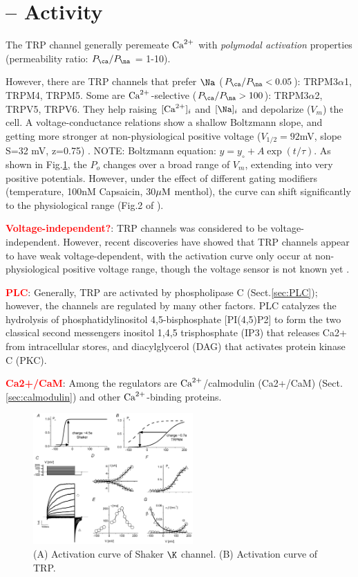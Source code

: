 \section{-- Activity}
\label{sec:TRP-regulator}

The TRP channel generally peremeate ${\text{Ca}^{2+}}$ with {\it polymodal activation}
properties (permeability ratio: $P_\ca/P_\na$ = 1-10). 

However, there are TRP channels that prefer $\Na$ ($P_\ca/P_\na< 0.05$):
TRPM3$\alpha$1, TRPM4, TRPM5.
Some are ${\text{Ca}^{2+}}$-selective ($P_\ca/P_\na>100$): TRPM3$\alpha$2, TRPV5, TRPV6.
They help raising $[{\text{Ca}^{2+}}]_i$ and $[\Na]_i$ and depolarize ($V_m$) the cell. A
voltage-conductance relations show a shallow Boltzmann slope, and getting more
stronger at non-physiological positive voltage ($V_{1/2}=92$mV, slope S=32 mV,
z=0.75) \citep{nilius2005}. NOTE: Boltzmann equation: $y=y_\circ +
A\exp(t/\tau)$. As shown in Fig.\ref{fig:TRP_Vm}, the $P_o$ changes over a broad
range of $V_m$, extending into very positive potentials. However, under the
effect of different gating modifiers (temperature, 100nM Capsaicin, 30${\mu\text{M}}$
menthol), the curve can shift significantly to the physiological range (Fig.2 of
\citep{nilius2005}).

\textcolor{red}{\bf Voltage-independent?}: TRP channels was considered to be
voltage-independent. However, recent discoveries have showed that TRP channels
appear to have weak voltage-dependent, with the activation curve only occur at
non-physiological positive voltage range, though the voltage sensor is not known
yet \citep{nilius2005}.


\textcolor{red}{\bf PLC}: Generally, TRP are activated by phospholipase C
(Sect.\ref{sec:PLC}); however, the channels are regulated by many other factors.
PLC catalyzes the hydrolysis of phosphatidylinositol 4,5-bisphosphate
[PI(4,5)P2] to form the two classical second messengers inositol 1,4,5
trisphosphate (IP3) that releases Ca2+ from intracellular stores, and
diacylglycerol (DAG) that activates protein kinase C (PKC).

\textcolor{red}{\bf Ca2+/CaM}: Among the regulators are ${\text{Ca}^{2+}}$/calmodulin
(Ca2+/CaM) (Sect.\ref{sec:calmodulin}) and other ${\text{Ca}^{2+}}$-binding proteins. 



\begin{figure}[hbt]
  \centerline{\includegraphics[height=5cm,
    angle=0]{./images/TRP_Vm-dependent.eps}}
  \caption{(A) Activation curve of Shaker $\K$ channel. (B) Activation curve of
  TRP.}
  \label{fig:TRP_Vm}
\end{figure}



